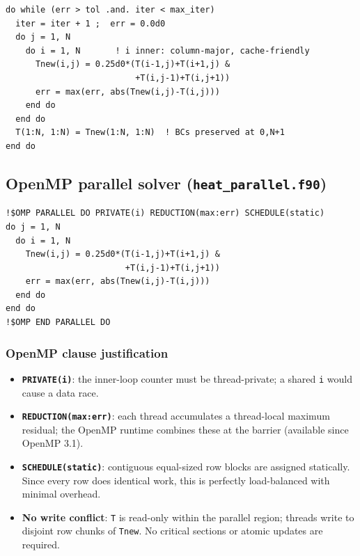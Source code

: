 \documentclass[12pt,a4paper]{article}
\begin{document}
\begin{lstlisting}[caption={Serial Jacobi loop. \texttt{i} is the inner
  index, aligning with Fortran's column-major storage.},label={lst:ser}]
do while (err > tol .and. iter < max_iter)
  iter = iter + 1 ;  err = 0.0d0
  do j = 1, N
    do i = 1, N       ! i inner: column-major, cache-friendly
      Tnew(i,j) = 0.25d0*(T(i-1,j)+T(i+1,j) &
                          +T(i,j-1)+T(i,j+1))
      err = max(err, abs(Tnew(i,j)-T(i,j)))
    end do
  end do
  T(1:N, 1:N) = Tnew(1:N, 1:N)  ! BCs preserved at 0,N+1
end do
\end{lstlisting}

\subsection{OpenMP parallel solver (\texttt{heat\_parallel.f90})}

\begin{lstlisting}[caption={OpenMP directives on the Jacobi sweep.
  The outer \texttt{j}-loop is distributed across threads.},label={lst:omp}]
!$OMP PARALLEL DO PRIVATE(i) REDUCTION(max:err) SCHEDULE(static)
do j = 1, N
  do i = 1, N
    Tnew(i,j) = 0.25d0*(T(i-1,j)+T(i+1,j) &
                        +T(i,j-1)+T(i,j+1))
    err = max(err, abs(Tnew(i,j)-T(i,j)))
  end do
end do
!$OMP END PARALLEL DO
\end{lstlisting}

\subsubsection*{OpenMP clause justification}
\begin{itemize}[noitemsep]
  \item \textbf{\texttt{PRIVATE(i)}}: the inner-loop counter must be
        thread-private; a shared \texttt{i} would cause a data race.
  \item \textbf{\texttt{REDUCTION(max:err)}}: each thread accumulates a
        thread-local maximum residual; the OpenMP runtime combines these at
        the barrier (available since OpenMP 3.1).
  \item \textbf{\texttt{SCHEDULE(static)}}: contiguous equal-sized row
        blocks are assigned statically. Since every row does identical work,
        this is perfectly load-balanced with minimal overhead.
  \item \textbf{No write conflict}: \texttt{T} is read-only within the
        parallel region; threads write to disjoint row chunks of \texttt{Tnew}.
        No critical sections or atomic updates are required.
\end{itemize}
\end{document}

